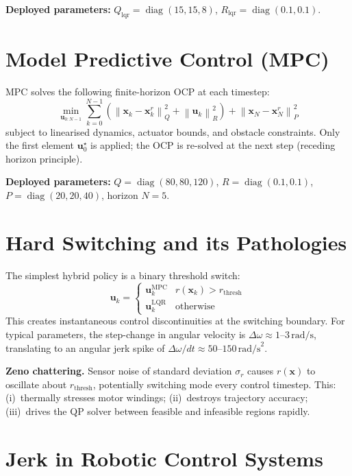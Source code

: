 \documentclass[12pt,a4paper,oneside]{report}
\newcommand{\norm}[1]{\left\lVert#1\right\rVert}
\newcommand{\diag}{\operatorname{diag}}
\begin{document}
\textbf{Deployed parameters:}
\(Q_{\mathrm{lqr}} = \diag(15,15,8)\), \(R_{\mathrm{lqr}} = \diag(0.1,0.1)\).

\section{Model Predictive Control (MPC)}

MPC solves the following finite-horizon OCP at each timestep:
\begin{equation}\label{eq:mpc_ocp}
  \min_{\mathbf{u}_{0:N-1}}
    \sum_{k=0}^{N-1}\!\left(\norm{\mathbf{x}_k-\mathbf{x}^r_k}_{Q}^2
    +\norm{\mathbf{u}_k}_{R}^2\right) + \norm{\mathbf{x}_N-\mathbf{x}^r_N}_{P}^2
\end{equation}
subject to linearised dynamics, actuator bounds, and obstacle constraints.
Only the first element \(\mathbf{u}_0^\star\) is applied; the OCP is
re-solved at the next step (receding horizon principle).

\textbf{Deployed parameters:}
\(Q=\diag(80,80,120)\), \(R=\diag(0.1,0.1)\), \(P=\diag(20,20,40)\),
horizon \(N=5\).

\section{Hard Switching and its Pathologies}

The simplest hybrid policy is a binary threshold switch:
\begin{equation}
  \mathbf{u}_k =
  \begin{cases}
    \mathbf{u}^{\mathrm{MPC}}_k & r(\mathbf{x}_k) > r_{\mathrm{thresh}}\\
    \mathbf{u}^{\mathrm{LQR}}_k & \text{otherwise}
  \end{cases}
\end{equation}
This creates instantaneous control discontinuities at the switching boundary.
For typical parameters, the step-change in angular velocity is
\(\Delta\omega \approx 1\text{--}3\,\text{rad/s}\), translating to an
angular jerk spike of \(\Delta\omega/dt \approx 50\text{--}150\,\text{rad/s}^2\).

\textbf{Zeno chattering.} Sensor noise of standard deviation \(\sigma_r\)
causes \(r(\mathbf{x})\) to oscillate about \(r_{\mathrm{thresh}}\),
potentially switching mode every control timestep. This:
(i)~thermally stresses motor windings; (ii)~destroys trajectory accuracy;
(iii)~drives the QP solver between feasible and infeasible regions rapidly.

\section{Jerk in Robotic Control Systems}
\end{document}

